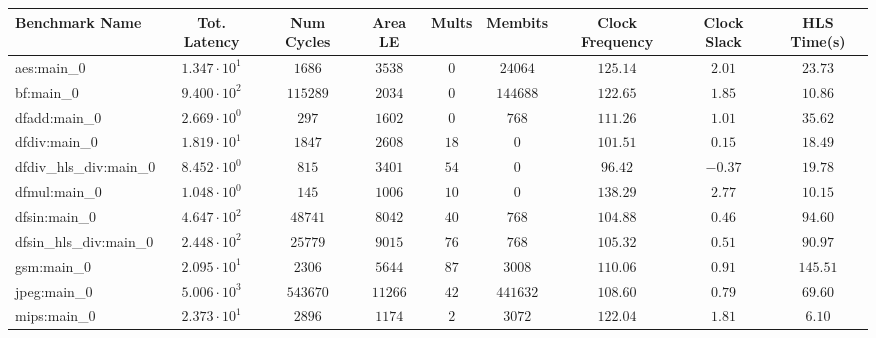 \begin{tabular}{|l|c|c|c|c|c|c|c|c|}
\hline
Benchmark Name          & Tot. Latency           & Num Cycles & Area LE   & Mults   & Membits    & Clock Frequency & Clock Slack & HLS Time(s) \\
\hline
aes:main\_0             & $ 1.347 \cdot 10^{1} $ & $ 1686   $ & $ 3538  $ & $ 0   $ & $ 24064  $ & $ 125.14      $ & $ 2.01    $ & $ 23.73   $ \\
bf:main\_0              & $ 9.400 \cdot 10^{2} $ & $ 115289 $ & $ 2034  $ & $ 0   $ & $ 144688 $ & $ 122.65      $ & $ 1.85    $ & $ 10.86   $ \\
dfadd:main\_0           & $ 2.669 \cdot 10^{0} $ & $ 297    $ & $ 1602  $ & $ 0   $ & $ 768    $ & $ 111.26      $ & $ 1.01    $ & $ 35.62   $ \\
dfdiv:main\_0           & $ 1.819 \cdot 10^{1} $ & $ 1847   $ & $ 2608  $ & $ 18  $ & $ 0      $ & $ 101.51      $ & $ 0.15    $ & $ 18.49   $ \\
dfdiv\_hls\_div:main\_0 & $ 8.452 \cdot 10^{0} $ & $ 815    $ & $ 3401  $ & $ 54  $ & $ 0      $ & $ 96.42       $ & $ -0.37   $ & $ 19.78   $ \\
dfmul:main\_0           & $ 1.048 \cdot 10^{0} $ & $ 145    $ & $ 1006  $ & $ 10  $ & $ 0      $ & $ 138.29      $ & $ 2.77    $ & $ 10.15   $ \\
dfsin:main\_0           & $ 4.647 \cdot 10^{2} $ & $ 48741  $ & $ 8042  $ & $ 40  $ & $ 768    $ & $ 104.88      $ & $ 0.46    $ & $ 94.60   $ \\
dfsin\_hls\_div:main\_0 & $ 2.448 \cdot 10^{2} $ & $ 25779  $ & $ 9015  $ & $ 76  $ & $ 768    $ & $ 105.32      $ & $ 0.51    $ & $ 90.97   $ \\
gsm:main\_0             & $ 2.095 \cdot 10^{1} $ & $ 2306   $ & $ 5644  $ & $ 87  $ & $ 3008   $ & $ 110.06      $ & $ 0.91    $ & $ 145.51  $ \\
jpeg:main\_0            & $ 5.006 \cdot 10^{3} $ & $ 543670 $ & $ 11266 $ & $ 42  $ & $ 441632 $ & $ 108.60      $ & $ 0.79    $ & $ 69.60   $ \\
mips:main\_0            & $ 2.373 \cdot 10^{1} $ & $ 2896   $ & $ 1174  $ & $ 2   $ & $ 3072   $ & $ 122.04      $ & $ 1.81    $ & $ 6.10    $ \\

\end{tabular}
